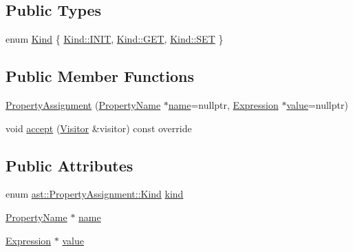 \subsection*{Public Types}
\begin{DoxyCompactItemize}
\item 
enum \hyperlink{structast_1_1_property_assignment_a33441184223429a4876fd968c4f63a97}{Kind} \{ \hyperlink{structast_1_1_property_assignment_a33441184223429a4876fd968c4f63a97afaee4ca3c30ee18148ce3ada37466498}{Kind\+::\+I\+N\+IT}, 
\hyperlink{structast_1_1_property_assignment_a33441184223429a4876fd968c4f63a97a7528035a93ee69cedb1dbddb2f0bfcc8}{Kind\+::\+G\+ET}, 
\hyperlink{structast_1_1_property_assignment_a33441184223429a4876fd968c4f63a97a8c52684db8f49511e9b44471716bf164}{Kind\+::\+S\+ET}
 \}
\end{DoxyCompactItemize}
\subsection*{Public Member Functions}
\begin{DoxyCompactItemize}
\item 
\hyperlink{structast_1_1_property_assignment_a3126805bfc63f01db97974b10e19d204}{Property\+Assignment} (\hyperlink{structast_1_1_property_name}{Property\+Name} $\ast$\hyperlink{structast_1_1_property_assignment_ade359a883741e5dfec19d48f1eb5d060}{name}=nullptr, \hyperlink{structast_1_1_expression}{Expression} $\ast$\hyperlink{structast_1_1_property_assignment_aa7325aea8709dfe9b310c6942604efd6}{value}=nullptr)
\item 
void \hyperlink{structast_1_1_property_assignment_ace7339b9afcf7d9a6fb0a33ab27ccdc1}{accept} (\hyperlink{structast_1_1_visitor}{Visitor} \&visitor) const override
\end{DoxyCompactItemize}
\subsection*{Public Attributes}
\begin{DoxyCompactItemize}
\item 
enum \hyperlink{structast_1_1_property_assignment_a33441184223429a4876fd968c4f63a97}{ast\+::\+Property\+Assignment\+::\+Kind} \hyperlink{structast_1_1_property_assignment_a9412f5914291d3be87b4bba0b91e08f7}{kind}
\item 
\hyperlink{structast_1_1_property_name}{Property\+Name} $\ast$ \hyperlink{structast_1_1_property_assignment_ade359a883741e5dfec19d48f1eb5d060}{name}
\item 
\hyperlink{structast_1_1_expression}{Expression} $\ast$ \hyperlink{structast_1_1_property_assignment_aa7325aea8709dfe9b310c6942604efd6}{value}
\end{DoxyCompactItemize}



